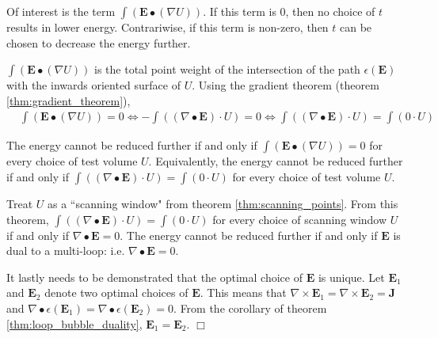 Of interest is the term \(\int (\mathbf{E} \bullet (\nabla U))\). If this term is \(0\), then no choice of \(t\) results in lower energy. Contrariwise, if this term is non-zero, then \(t\) can be chosen to decrease the energy further. 

\(\int (\mathbf{E} \bullet (\nabla U))\) is the total point weight of the intersection of the path \(\epsilon(\mathbf{E})\) with the inwards oriented surface of \(U\). Using the gradient theorem (theorem \ref{thm:gradient_theorem}), 
\begin{align*}
& \int (\mathbf{E} \bullet (\nabla U)) = 0
\iff -\int ((\nabla \bullet \mathbf{E}) \cdot U) = 0 
\iff \int ((\nabla \bullet \mathbf{E}) \cdot U) = \int (0 \cdot U) 
\end{align*}

The energy cannot be reduced further if and only if \(\int (\mathbf{E} \bullet (\nabla U)) = 0\) for every choice of test volume \(U\). Equivalently, the energy cannot be reduced further if and only if \(\int ((\nabla \bullet \mathbf{E}) \cdot U) = \int (0 \cdot U)\) for every choice of test volume \(U\).

Treat \(U\) as a ``scanning window" from theorem \ref{thm:scanning_points}. From this theorem, \(\int ((\nabla \bullet \mathbf{E}) \cdot U) = \int (0 \cdot U)\) for every choice of scanning window \(U\) if and only if \(\nabla \bullet \mathbf{E} = 0\). The energy cannot be reduced further if and only if \(\mathbf{E}\) is dual to a multi-loop: i.e. \(\nabla \bullet \mathbf{E} = 0\).

It lastly needs to be demonstrated that the optimal choice of \(\mathbf{E}\) is unique. Let \(\mathbf{E}_1\) and \(\mathbf{E}_2\) denote two optimal choices of \(\mathbf{E}\). This means that \(\nabla \times \mathbf{E}_1 = \nabla \times \mathbf{E}_2 = \mathbf{J}\) and \(\nabla \bullet \epsilon(\mathbf{E}_1) = \nabla \bullet \epsilon(\mathbf{E}_2) = 0\). From the corollary of theorem \ref{thm:loop_bubble_duality}, \(\mathbf{E}_1 = \mathbf{E}_2\). \(\Box\) 


